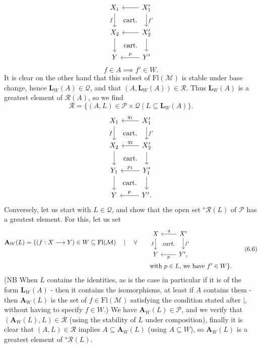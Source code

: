 \documentclass[11pt]{article}
\newcommand{\printedpage}[1]{\marginpar{\footnotesize p.~#1}}
\newcommand{\Fl}{\mathrm{Fl}}
\begin{document}
\[
\begin{tikzcd}
X_1 \arrow[d, "f"'] \arrow[dr, phantom, "\text{cart.}"] & X'_1 \arrow[l] \arrow[d, "f'"] \\
X_2 \arrow[d] \arrow[dr, phantom, "\text{cart.}"] & X'_2 \arrow[l] \arrow[d] \\
Y & Y' \arrow[l, "p"']
\end{tikzcd}
\]
\[
f\in A\implies f'\in W.
\]
It is clear on the other hand that this subset of $\Fl(\mathcal{M})$ is stable under base change, hence $\mathbf{L}_W(A)\in\mathcal{Q}$, and that $(A,\mathbf{L}_W(A))\in\mathcal{R}$. Thus $\mathbf{L}_W(A)$ is a greatest element of $\mathcal{R}(A)$, so we find
\[
\mathcal{R}=\{(A,L)\in\mathcal{P}\times\mathcal{Q}\mid L\subseteq\mathbf{L}_W(A)\}.
\tag*{(6.5)}
\]
\printedpage{53}
\[
\begin{tikzcd}
X_1 \arrow[d, "f"'] \arrow[dr, phantom, "\text{cart.}"] & X'_1 \arrow[l, "q_1"'] \arrow[d, "f'"] \\
X_2 \arrow[d] \arrow[dr, phantom, "\text{cart.}"] & X'_2 \arrow[l, "q_2"'] \arrow[d] \\
Y_1 \arrow[d] \arrow[dr, phantom, "\text{cart.}"] & Y'_1 \arrow[l, "p_1"'] \arrow[d] \\
Y & Y'. \arrow[l, "p"']
\end{tikzcd}
\]
Conversely, let us start with $L\in\mathcal{Q}$, and show that the open set ${}^{s}\mathcal{R}(L)$ of $\mathcal{P}$ has a greatest element. For this, let us set
\[
\begin{aligned}
\mathbf{A}_W(L)=\{(f : X\longrightarrow Y)\in W\subseteq\Fl(\mathcal{M})\quad\mid\quad\forall\qquad
&\begin{tikzcd}[ampersand replacement=\&]
X \arrow[d, "f"'] \arrow[dr, phantom, "\textit{cart.}"] \& X' \arrow[l, "q"'] \arrow[d, "f'"] \\
Y \& Y', \arrow[l, "p"]
\end{tikzcd}\\
&\text{with $p\in L$, we have $f'\in W$}\}.
\end{aligned}
\tag*{(6.6)}
\]
(NB When $L$ contains the identities, as is the case in particular if it is of the form $\mathbf{L}_W(A)$ - then it contains the isomorphisms, at least if $A$ contains them - then $\mathbf{A}_W(L)$ is the set of $f\in\Fl(\mathcal{M})$ satisfying the condition stated after $|$, without having to specify $f\in W$.) We have $\mathbf{A}_W(L)\in\mathcal{P}$, and we verify that $(\mathbf{A}_W(L),L)\in\mathcal{R}$ (using the stability of $L$ under composition), finally it is clear that $(A,L)\in\mathcal{R}$ implies $A\subseteq\mathbf{A}_W(L)$ (using $A\subseteq W$), so $\mathbf{A}_W(L)$ is a greatest element of ${}^{s}\mathcal{R}(L)$.
\end{document}
